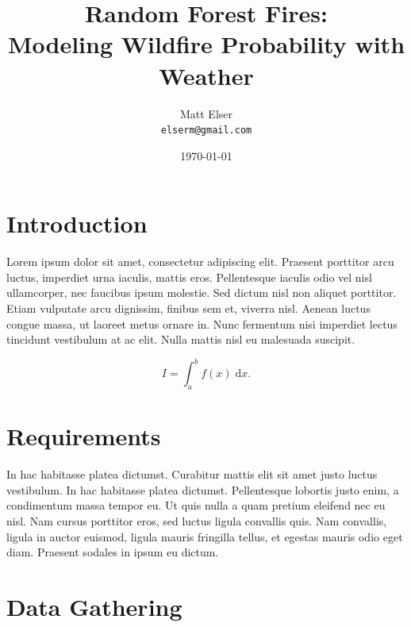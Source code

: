 \documentclass{article}
\title{Random Forest Fires:\\Modeling Wildfire Probability with Weather} %
\author{Matt Elser\\ \texttt{elserm@gmail.com}} %
\date{\today} %
\begin{document}
\maketitle %


\section*{Introduction} %

Lorem ipsum dolor sit amet, consectetur adipiscing elit. Praesent porttitor arcu luctus, imperdiet urna iaculis, mattis eros. Pellentesque iaculis odio vel nisl ullamcorper, nec faucibus ipsum molestie. Sed dictum nisl non aliquet porttitor. Etiam vulputate arcu dignissim, finibus sem et, viverra nisl. Aenean luctus congue massa, ut laoreet metus ornare in. Nunc fermentum nisi imperdiet lectus tincidunt vestibulum at ac elit. Nulla mattis nisl eu malesuada suscipit.

\begin{equation}
	I = \int_{a}^{b} f(x) \; \text{d}x.
\end{equation}


\section{Requirements} %

In hac habitasse platea dictumst. Curabitur mattis elit sit amet justo luctus vestibulum. In hac habitasse platea dictumst. Pellentesque lobortis justo enim, a condimentum massa tempor eu. Ut quis nulla a quam pretium eleifend nec eu nisl. Nam cursus porttitor eros, sed luctus ligula convallis quis. Nam convallis, ligula in auctor euismod, ligula mauris fringilla tellus, et egestas mauris odio eget diam. Praesent sodales in ipsum eu dictum.


\section{Data Gathering}
\end{document}
